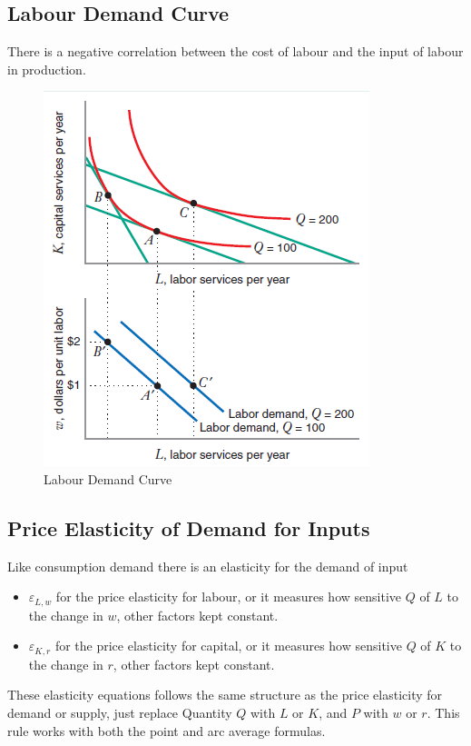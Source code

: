 \documentclass[../ECON-281-Notes.tex]{subfiles}
\begin{document}
\subsection{Labour Demand Curve}
There is a negative correlation between the cost of labour and the input of labour in production.

\begin{figure}[!h]
    \centering
    \includegraphics[width=\columnwidth]{../assets/labour_demand_curve.png}   
    \caption{Labour Demand Curve}
    \label{fig:labour_demand_curve}
\end{figure}

\subsection{Price Elasticity of Demand for Inputs}
Like consumption demand there is an elasticity for the demand of input 
\begin{itemize}
    \item \(\varepsilon_{L,w}\) for the price elasticity for labour, or it measures how sensitive \(Q\) of \(L\) to the change in \(w\), other factors kept constant.
    \item \(\varepsilon_{K,r}\) for the price elasticity for capital, or it measures how sensitive \(Q\) of \(K\) to the change in \(r\), other factors kept constant.
\end{itemize}
These elasticity equations follows the same structure as the price elasticity for demand or supply, just replace Quantity \(Q\) with \(L\) or \(K\), and \(P\) with \(w\) or \(r\). This rule works with both the point and arc average formulas. 
\end{document}
